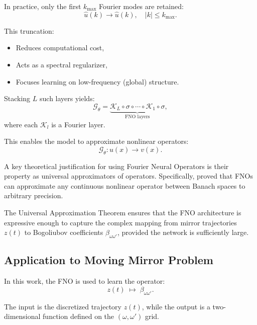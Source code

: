 In practice, only the first $k_{\max}$ Fourier modes are retained:
\begin{equation}
\hat{u}(k) \rightarrow \hat{u}(k), \quad |k| \leq k_{\max}.
\end{equation}

This truncation:
\begin{itemize}
    \item Reduces computational cost,
    \item Acts as a spectral regularizer,
    \item Focuses learning on low-frequency (global) structure.
\end{itemize}

Stacking $L$ such layers yields:
\[
\mathcal{G}_\theta = \underbrace{\mathcal{K}_L \circ \sigma \circ \cdots \circ \mathcal{K}_1 \circ \sigma}_{\text{FNO layers}},
\]
where each $\mathcal{K}_l$ is a Fourier layer.

This enables the model to approximate nonlinear operators:
\[
\mathcal{G}_\theta: u(x) \rightarrow v(x).
\]

A key theoretical justification for using Fourier Neural Operators is their property as universal approximators of operators. Specifically, \cite{kovachki2021} proved that FNOs can approximate any continuous nonlinear operator between Banach spaces to arbitrary precision.

The Universal Approximation Theorem ensures that the FNO architecture is expressive enough to capture the complex mapping from mirror trajectories $z(t)$ to Bogoliubov coefficients $\beta_{\omega\omega'}$, provided the network is sufficiently large.

\subsection{Application to Moving Mirror Problem}

In this work, the FNO is used to learn the operator:
\[
z(t) \;\longmapsto\; \beta_{\omega \omega'}.
\]

The input is the discretized trajectory $z(t)$, while the output is a two-dimensional function defined on the $(\omega, \omega')$ grid.

